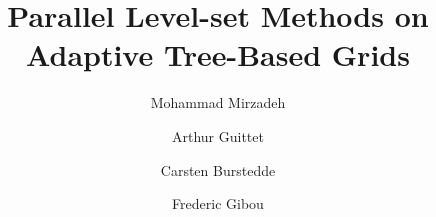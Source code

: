\documentclass[final]{elsarticle}
\begin{document}
\title{Parallel Level-set Methods on Adaptive Tree-Based Grids}

\address[MECHE]{Department of Mechanical Engineering, University of California, Santa Barbara, CA 93106-5070, United States.}
\address[CS]{Department of Computer Science, University of California, Santa Barbara, CA 93106-5110, United States.}
\address[UBONN]{Institute for Numerical Simulation, University of Bonn, Bonn 53115, Germany.}

\author[MECHE]{Mohammad Mirzadeh} \author[MECHE]{Arthur Guittet} \author[UBONN] {Carsten Burstedde} \author[MECHE,CS]{Frederic Gibou}











\end{document}
